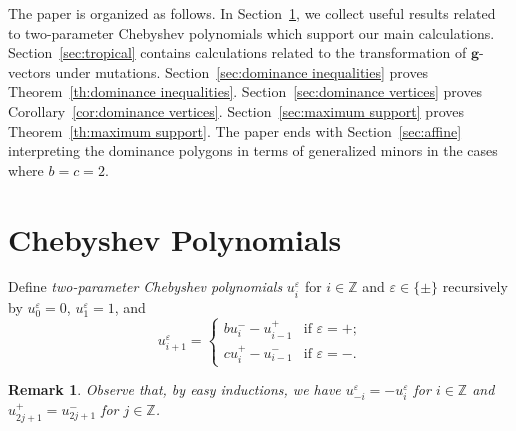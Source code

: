 \documentclass{amsart}
\newtheorem{remark}[theorem]{Remark}
\numberwithin{theorem}{section}
\newcommand{\bfg}{\boldsymbol{g}}
\newcommand{\ZZ}{\mathbb{Z}}
\begin{document}
The paper is organized as follows.
In Section~\ref{sec:chebyshev}, we collect useful results related to two-parameter Chebyshev polynomials which support our main calculations.
Section~\ref{sec:tropical} contains calculations related to the transformation of $\bfg$-vectors under mutations.
Section~\ref{sec:dominance inequalities} proves Theorem~\ref{th:dominance inequalities}.
Section~\ref{sec:dominance vertices} proves Corollary~\ref{cor:dominance vertices}.
Section~\ref{sec:maximum support} proves Theorem~\ref{th:maximum support}.
The paper ends with Section~\ref{sec:affine} interpreting the dominance polygons in terms of generalized minors in the cases where $b=c=2$.


\section{Chebyshev Polynomials}
  \label{sec:chebyshev}
  Define \emph{two-parameter Chebyshev polynomials} $u_i^\varepsilon$ for $i\in\ZZ$ and $\varepsilon\in\{\pm\}$ recursively by $u_0^\varepsilon=0$, $u_1^\varepsilon=1$, and
  \[u_{i+1}^\varepsilon=\begin{cases} bu_i^- -u_{i-1}^+ & \text{if $\varepsilon=+$;}\\ cu_i^+-u_{i-1}^- & \text{if $\varepsilon=-$.} \end{cases}\]
  \begin{remark}
    Observe that, by easy inductions, we have $u_{-i}^\varepsilon=-u_i^\varepsilon$ for $i\in\ZZ$ and $u_{2j+1}^+=u_{2j+1}^-$ for $j\in\ZZ$.
  \end{remark}
\end{document}

